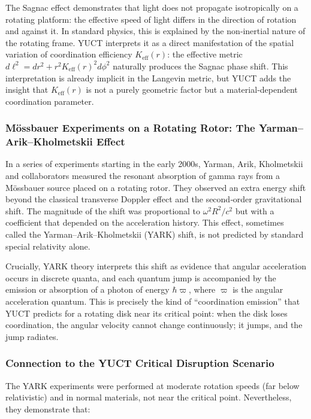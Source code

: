 \documentclass[12pt,a4paper]{article}
\begin{document}
The Sagnac effect demonstrates that light does not propagate isotropically on a rotating platform: the effective speed of light differs in the direction of rotation and against it. In standard physics, this is explained by the non‑inertial nature of the rotating frame. YUCT interprets it as a direct manifestation of the spatial variation of coordination efficiency \(K_{\mathrm{eff}}(r)\): the effective metric \(d\ell^2 = dr^2 + r^2 K_{\mathrm{eff}}(r)^2 d\phi^2\) naturally produces the Sagnac phase shift. This interpretation is already implicit in the Langevin metric, but YUCT adds the insight that \(K_{\mathrm{eff}}(r)\) is not a purely geometric factor but a material‑dependent coordination parameter.

\subsubsection{Mössbauer Experiments on a Rotating Rotor: The Yarman–Arik–Kholmetskii Effect}

In a series of experiments starting in the early 2000s, Yarman, Arik, Kholmetskii and collaborators measured the resonant absorption of gamma rays from a Mössbauer source placed on a rotating rotor. They observed an extra energy shift beyond the classical transverse Doppler effect and the second‑order gravitational shift. The magnitude of the shift was proportional to \(\omega^2 R^2 / c^2\) but with a coefficient that depended on the acceleration history. This effect, sometimes called the Yarman–Arik–Kholmetskii (YARK) shift, is not predicted by standard special relativity alone.

Crucially, YARK theory interprets this shift as evidence that angular acceleration occurs in discrete quanta, and each quantum jump is accompanied by the emission or absorption of a photon of energy \(\hbar \varpi\), where \(\varpi\) is the angular acceleration quantum. This is precisely the kind of “coordination emission” that YUCT predicts for a rotating disk near its critical point: when the disk loses coordination, the angular velocity cannot change continuously; it jumps, and the jump radiates.

\subsubsection{Connection to the YUCT Critical Disruption Scenario}

The YARK experiments were performed at moderate rotation speeds (far below relativistic) and in normal materials, not near the critical point. Nevertheless, they demonstrate that:
\end{document}
